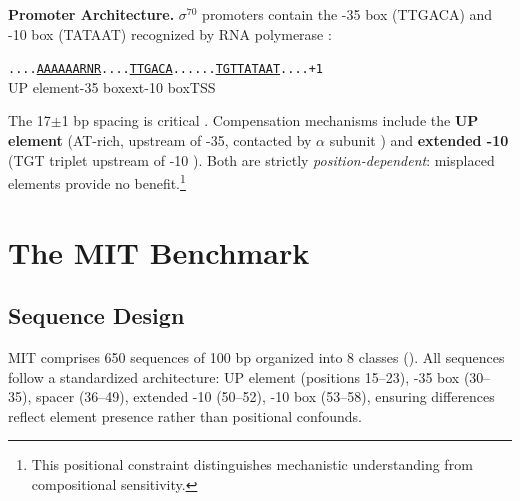 \documentclass{article}
\begin{document}
\textbf{Promoter Architecture.} $\sigma^{70}$ promoters contain the -35 box (TTGACA) and -10 box (TATAAT) recognized by RNA polymerase \citep{browning2004regulation}:

\begin{seqbox}
\texttt{....\underline{AAAAAARNR}....\underline{TTGACA}......\underline{TGT}\underline{TATAAT}....+1} \\
\hspace*{1.2em}\scriptsize{UP element}\hspace{1.1em}\scriptsize{-35 box}\hspace{2.2em}\scriptsize{ext}\hspace{0.3em}\scriptsize{-10 box}\hspace{0.8em}\scriptsize{TSS}
\end{seqbox}

\noindent The 17$\pm$1 bp spacing is critical \citep{harley1987analysis}. Compensation mechanisms include the \textbf{UP element} (AT-rich, upstream of -35, contacted by $\alpha$ subunit \citep{ross1993third}) and \textbf{extended -10} (TGT triplet upstream of -10 \citep{barne1997region}). Both are strictly \textit{position-dependent}: misplaced elements provide no benefit.\footnote{This positional constraint distinguishes mechanistic understanding from compositional sensitivity.}

\section{The MIT Benchmark}
\label{sec:benchmark}

\subsection{Sequence Design}

MIT comprises 650 sequences of 100 bp organized into 8 classes (). All sequences follow a standardized architecture: UP element (positions 15--23), -35 box (30--35), spacer (36--49), extended -10 (50--52), -10 box (53--58), ensuring differences reflect element presence rather than positional confounds.
\end{document}
